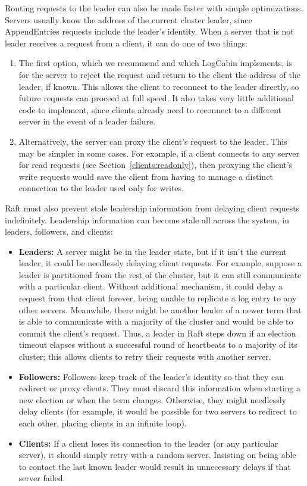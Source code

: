 Routing requests to the leader can also be made faster with simple
optimizations. Servers usually know the address of the current cluster
leader, since AppendEntries requests include the leader's identity.
When a server that is not leader receives a request from a
client, it can do one of two things:
%
\begin{enumerate}
%
\item The first option, which we recommend and which LogCabin
implements, is for the server to reject
the request and return to the client the address of the leader, if
known. This allows the client to reconnect to the leader directly,
so future requests can proceed at full speed. It also takes very
little additional code to implement, since clients already need to
reconnect to a different server in the event of a leader failure.
%
\item
Alternatively, the server can proxy the client's request to the
leader.
This may be simpler in some cases. For example, if a client connects
to any server for read requests (see Section~\ref{clients:readonly}),
then proxying the client's write requests would save the client from
having to manage a distinct connection to the leader used only for writes.
%
\end{enumerate}

Raft must also prevent stale leadership information from delaying client
requests indefinitely. Leadership information can become stale all
across the system, in leaders, followers, and clients:
%
\begin{itemize}
%
\item \textbf{Leaders:} A server might be in the leader state, but if it
isn't the current leader, it could be needlessly delaying client
requests. For example, suppose a leader is partitioned from the rest of
the cluster, but it can still communicate with a particular client.
Without additional mechanism, it could delay a request from that client
forever, being unable to replicate a log entry to any other servers.
Meanwhile, there might be another leader of a newer term that
is able to communicate with a majority of the cluster and would be able
to commit the client's request. Thus, a leader in Raft steps down if an
election timeout elapses without a successful round of heartbeats to a
majority of its cluster; this allows clients to retry their requests
with another server.
%
\item \textbf{Followers:} Followers keep track of the leader's identity
so that they can redirect or proxy clients. They must discard this
information when starting a new election or when the term changes.
Otherwise, they might needlessly delay clients (for example, it would be
possible for two servers to redirect to each other, placing clients in
an infinite loop).
%
\item \textbf{Clients:} If a client loses its connection to the leader
(or any particular server), it should simply retry with a random server.
Insisting on being able to contact the last known leader would result in
unnecessary delays if that server failed.
%
\end{itemize}

